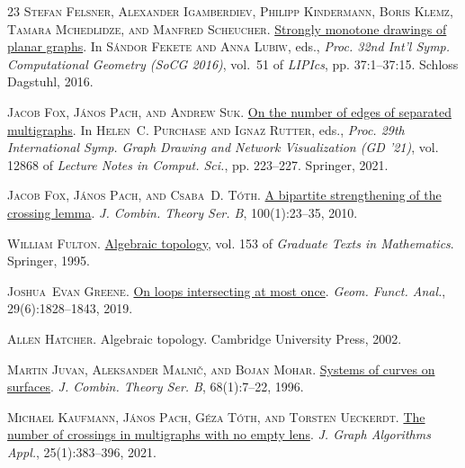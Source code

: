 \documentclass[a4paper,11pt]{article}
\begin{document}
\begin{thebibliography}{23}
	\textsc{Stefan Felsner, Alexander Igamberdiev, Philipp Kindermann, Boris Klemz, Tamara Mchedlidze, and Manfred Scheucher}.
	\newblock \href{https://doi.org/10.4230/LIPIcs.SoCG.2016.37}{{Strongly monotone drawings of planar graphs}}.
	\newblock In \textsc{S\'{a}ndor Fekete and Anna Lubiw}, eds., \emph{Proc. 32nd Int'l Symp. Computational Geometry \textup{(SoCG 2016)}}, vol.~51 of \emph{LIPIcs}, pp. 37:1--37:15. Schloss Dagstuhl, 2016.
	
	\textsc{Jacob Fox, J{\'{a}}nos Pach, and Andrew Suk}.
	\newblock \href{https://doi.org/10.1007/978-3-030-92931-2\_16}{On the number of edges of separated multigraphs}.
	\newblock In \textsc{Helen~C. Purchase and Ignaz Rutter}, eds., \emph{Proc. 29th International Symp. Graph Drawing and Network Visualization \textup{({GD} '21)}}, vol. 12868 of \emph{Lecture Notes in Comput. Sci.}, pp. 223--227. Springer, 2021.
	
	\textsc{Jacob Fox, J\'{a}nos Pach, and Csaba~D. T\'{o}th}.
	\newblock \href{https://doi.org/10.1016/j.jctb.2009.03.005}{A bipartite strengthening of the crossing lemma}.
	\newblock \emph{J. Combin. Theory Ser. B}, 100(1):23--35, 2010.
	
	\textsc{William Fulton}.
	\newblock \href{https://doi.org/10.1007/978-1-4612-4180-5}{Algebraic topology}, vol. 153 of \emph{Graduate Texts in Mathematics}.
	\newblock Springer, 1995.
	
	\textsc{Joshua~Evan Greene}.
	\newblock \href{https://doi.org/10.1007/s00039-019-00517-0}{On loops intersecting at most once}.
	\newblock \emph{Geom. Funct. Anal.}, 29(6):1828--1843, 2019.
	
	\textsc{Allen Hatcher}.
	\newblock Algebraic topology.
	\newblock Cambridge University Press, 2002.
	
	\textsc{Martin Juvan, Aleksander Malni{\v{c}}, and Bojan Mohar}.
	\newblock \href{https://doi.org/10.1006/jctb.1996.0053}{Systems of curves on surfaces}.
	\newblock \emph{J. Combin. Theory Ser. B}, 68(1):7--22, 1996.
	
	\textsc{Michael Kaufmann, J\'{a}nos Pach, G\'{e}za T\'{o}th, and Torsten Ueckerdt}.
	\newblock \href{https://doi.org/10.7155/jgaa.00563}{The number of crossings in multigraphs with no empty lens}.
	\newblock \emph{J. Graph Algorithms Appl.}, 25(1):383--396, 2021.
	

\end{thebibliography}
\end{document}
